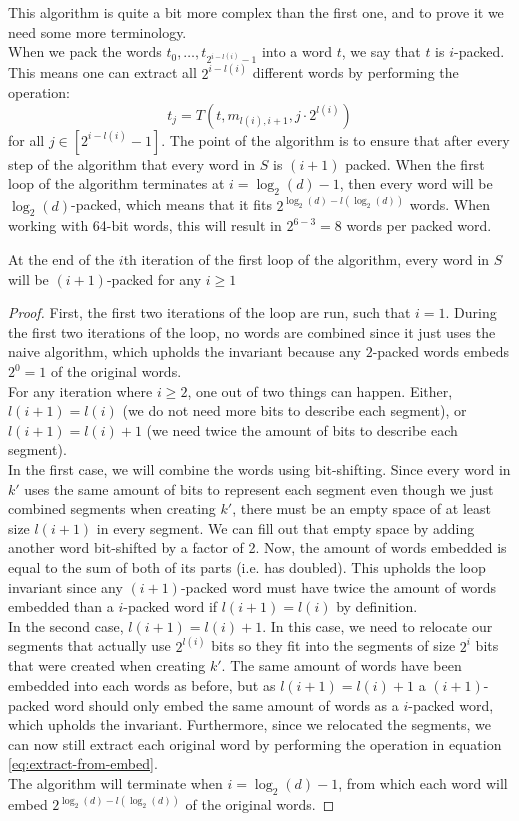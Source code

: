 This algorithm is quite a bit more complex than the first one, and to prove it we need some more terminology.\\
When we pack the words $t_0, \dots, t_{2^{i-l(i)}-1}$ into a word $t$, we say that $t$ is $i$-packed. This means one can extract all $2^{i-l(i)}$ different words by performing the operation:
\begin{equation}
    \label{eq:extract-from-embed}
t_j=T(t, m_{l(i), i+1}, j\cdot 2^{l(i)})
\end{equation}
for all $j\in [2^{i-l(i)}-1]$.
The point of the algorithm is to ensure that after every step of the algorithm that every word in $S$ is $(i+1)$ packed. When the first loop of the algorithm terminates at $i=\log_2(d)-1$, then every word will be $\log_2(d)$-packed, which means that it fits $2^{\log_2(d)-l(\log_2(d))}$ words. When working with 64-bit words, this will result in $2^{6-3}=8$ words per packed word.
\begin{invariant}
    At the end of the $i$th iteration of the first loop of the algorithm, every word in $S$ will be $(i+1)$-packed for any $i \geq 1$
\end{invariant}
\begin{proof}
    First, the first two iterations of the loop are run, such that $i=1$. During the first two iterations of the loop, no words are combined since it just uses the naive algorithm, which upholds the invariant because any $2$-packed words embeds $2^{0}=1$ of the original words.\\
    For any iteration where $i\geq 2$, one out of two things can happen. Either, $l(i+1) = l(i)$ (we do not need more bits to describe each segment), or $l(i + 1) = l(i) + 1$ (we need twice the amount of bits to describe each segment).\\
    In the first case, we will combine the words using bit-shifting. Since every word in $k'$ uses the same amount of bits to represent each segment even though we just combined segments when creating $k'$, there must be an empty space of at least size $l(i+1)$ in every segment. We can fill out that empty space by adding another word bit-shifted by a factor of 2. %
    Now, the amount of words embedded is equal to the sum of both of its parts (i.e. has doubled). This upholds the loop invariant since any $(i+1)$-packed word must have twice the amount of words embedded than a $i$-packed word if $l(i+1) = l(i)$ by definition.\\
    In the second case, $l(i + 1) = l(i) + 1$. In this case, we need to relocate our segments that actually use $2^{l(i)}$ bits so they fit into the segments of size $2^i$ bits that were created when creating $k'$.
    The same amount of words have been embedded into each words as before, but as $l(i+1) = l(i) + 1$ a $(i+1)$-packed word should only embed the same amount of words as a $i$-packed word, which upholds the invariant.
    Furthermore, since we relocated the segments, we can now still extract each original word by performing the operation in equation \ref{eq:extract-from-embed}.\\
    The algorithm will terminate when $i = \log_2(d) - 1$, from which each word will embed $2^{\log_2(d)-l(\log_2(d))}$ of the original words.
\end{proof}
